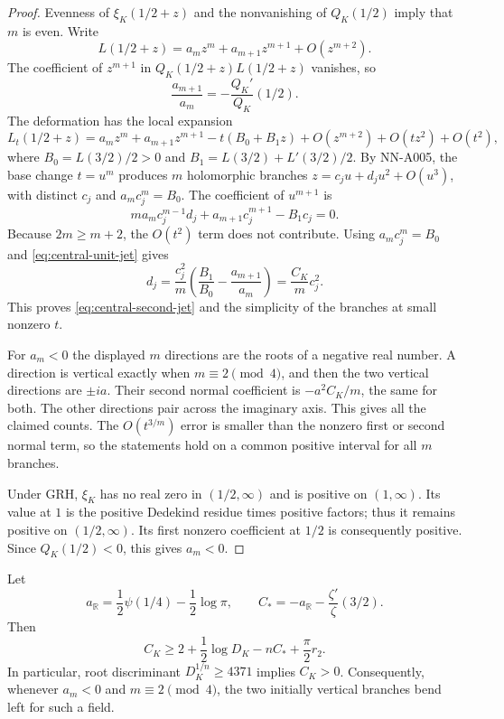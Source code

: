 \begin{proof}
Evenness of $\xi_K(1/2+z)$ and the nonvanishing of $Q_K(1/2)$ imply
that $m$ is even. Write
\[
 L(1/2+z)=a_mz^m+a_{m+1}z^{m+1}+O(z^{m+2}).
\]
The coefficient of $z^{m+1}$ in $Q_K(1/2+z)L(1/2+z)$ vanishes, so
\begin{equation}\label{eq:central-unit-jet}
 \frac{a_{m+1}}{a_m}=-\frac{Q_K'}{Q_K}(1/2).
\end{equation}
The deformation has the local expansion
\[
 L_t(1/2+z)=a_mz^m+a_{m+1}z^{m+1}
       -t(B_0+B_1z)+O(z^{m+2})+O(tz^2)+O(t^2),
\]
where $B_0=L(3/2)/2>0$ and
$B_1=L(3/2)+L'(3/2)/2$. By NN-A005, the base change $t=u^m$
produces $m$ holomorphic branches $z=c_ju+d_ju^2+O(u^3)$,
with distinct $c_j$ and $a_mc_j^m=B_0$. The coefficient of $u^{m+1}$
is
\[
 ma_mc_j^{m-1}d_j+a_{m+1}c_j^{m+1}-B_1c_j=0.
\]
Because $2m\ge m+2$, the $O(t^2)$ term does not contribute.
Using $a_mc_j^m=B_0$ and \eqref{eq:central-unit-jet} gives
\[
 d_j=\frac{c_j^2}{m}
       \left(\frac{B_1}{B_0}-\frac{a_{m+1}}{a_m}\right)
     =\frac{C_K}{m}c_j^2.
\]
This proves \eqref{eq:central-second-jet} and the simplicity of
the branches at small nonzero $t$.

For $a_m<0$ the displayed $m$ directions are the roots of a negative
real number. A direction is vertical exactly when $m\equiv2\pmod4$,
and then the two vertical directions are $\pm ia$. Their second
normal coefficient is $-a^2C_K/m$, the same for both. The other
directions pair across the imaginary axis. This gives all the
claimed counts. The $O(t^{3/m})$ error is smaller than the nonzero
first or second normal term, so the statements hold on a common
positive interval for all $m$ branches.

Under GRH, $\xi_K$ has no real zero in $(1/2,\infty)$ and is positive
on $(1,\infty)$. Its value at $1$ is the positive Dedekind residue
times positive factors; thus it remains positive on $(1/2,\infty)$.
Its first nonzero coefficient at $1/2$ is consequently positive.
Since $Q_K(1/2)<0$, this gives $a_m<0$.
\end{proof}

\begin{proposition}
Let
\[
 a_{\mathbb R}=\frac12\psi(1/4)-\frac12\log\pi,
 \qquad C_*=-a_{\mathbb R}-\frac{\zeta'}{\zeta}(3/2).
\]
Then
\begin{equation}\label{eq:central-C-bound}
 C_K\ge2+\frac12\log D_K-nC_*+\frac\pi2r_2.
\end{equation}
In particular, root discriminant $D_K^{1/n}\ge4371$ implies $C_K>0$.
Consequently, whenever $a_m<0$ and $m\equiv2\pmod4$, the two
initially vertical branches bend left for such a field.
\end{proposition}

